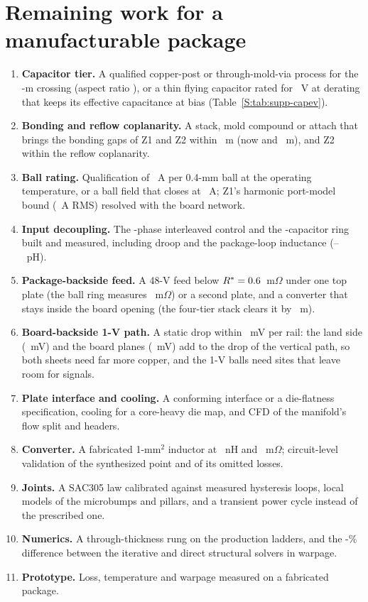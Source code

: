 \documentclass[10pt]{article}
\newcommand{\cl}[1]{\textbf{#1}\enspace}
\begin{document}
\section*{Remaining work for a manufacturable package}
\begin{enumerate}
\item \cl{Capacitor tier.} A qualified copper-post or through-mold-via process for the
\MthTierOne-\textmu m crossing (aspect ratio \MthWorstAR), or a thin flying capacitor rated for
\FrConvCapVone~V at \FrConvCapDerate{} derating that keeps its effective capacitance at bias
(Table~\ref{S:tab:supp-capev}).
\item \cl{Bonding and reflow coplanarity.} A stack, mold compound or attach that brings the bonding
gaps of Z1 and Z2 within \MvTcbLim~\textmu m (now \MvRfTcbZone{} and \MvRfTcbZtwo~\textmu m), and Z2
within the reflow coplanarity.
\item \cl{Ball rating.} Qualification of \BgaTarget~A per 0.4-mm ball at the operating temperature,
or a ball field that closes at \BgaTargetSens~A; Z1's harmonic port-model bound
(\BgaRmsBoundZone~A RMS) resolved with the board network.
\item \cl{Input decoupling.} The \FrDecapPhases-phase interleaved control and the \FrDecapN-capacitor
ring built and measured, including droop and the package-loop inductance
(\WrLloopLo--\WrLloopHi~pH).
\item \cl{Package-backside feed.} A 48-V feed below $R^* = 0.6$~m$\Omega$ under one top
plate (the ball ring measures \FeedRbgaZtwo~m$\Omega$) or a second plate, and a converter that
stays inside the board opening (the four-tier stack clears it by \FrFitThirtysix~\textmu m).
\item \cl{Board-backside 1-V path.} A static drop within \MthLimDrop~mV per rail: the land side
(\VdropLandBZthree~mV) and the board planes (\VdropPlanesBZthree~mV) add to the drop of the vertical
path, so both sheets need far more copper, and the 1-V balls need sites that leave room for signals.
\item \cl{Plate interface and cooling.} A conforming interface or a die-flatness specification,
cooling for a core-heavy die map, and CFD of the manifold's flow split and headers.
\item \cl{Converter.} A fabricated 1-mm$^2$ inductor at \FrConvIndL~nH and \FrConvIndDcr~m$\Omega$;
circuit-level validation of the synthesized \FrConvTopo{} point and of its omitted losses.
\item \cl{Joints.} A SAC305 law calibrated against measured hysteresis loops, local models of the
microbumps and pillars, and a transient power cycle instead of the prescribed one.
\item \cl{Numerics.} A through-thickness rung on the production ladders, and the
\MthSolverWarp-\% difference between the iterative and direct structural solvers in warpage.
\item \cl{Prototype.} Loss, temperature and warpage measured on a fabricated package.
\end{enumerate}
\end{document}
